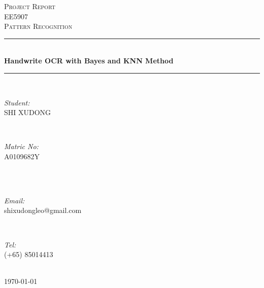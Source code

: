 \documentclass[12pt]{article} %
\begin{document}

\begin{titlepage}

\newcommand{\HRule}{\rule{\linewidth}{0.5mm}} %

\center %

\textsc{\LARGE Project Report}\\[1.5cm] %
\textsc{\Large EE5907}\\[0.5cm] %
\textsc{\large Pattern Recognition}\\[0.5cm] %

\HRule \\[0.4cm]
{ \LARGE \bfseries Handwrite OCR with Bayes and KNN Method}\\[0.4cm] %
\HRule \\[1.5cm]

\begin{minipage}{0.4\textwidth}
\begin{flushleft} \large
\emph{Student:}\\
SHI \textsc{XUDONG} %
\end{flushleft}
\end{minipage}
~
\begin{minipage}{0.4\textwidth}
\begin{flushright} \large
\emph{Matric No:} \\
A0109682Y \textsc{} %
\end{flushright}
\end{minipage}\\[0.5cm]
~
\begin{minipage}{0.4\textwidth}
\begin{flushleft} \large
\emph{Email:}\\
shixudongleo@gmail.com \textsc{} %
\end{flushleft}
\end{minipage}
~
\begin{minipage}{0.4\textwidth}
\begin{flushright} \large
\emph{Tel:}\\
(+65) 85014413 \textsc{} %
\end{flushright}
\end{minipage}\\[4cm]





{\large \today}\\[3cm] %


\vfill %

\end{titlepage}
\end{document}
